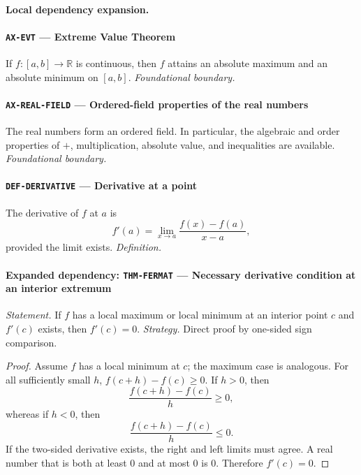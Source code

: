 \documentclass[10pt]{article}
\newcommand{\pidraw}[1]{\begingroup\urlstyle{tt}\nolinkurl{#1}\endgroup}
\theoremstyle{definition}
\theoremstyle{remark}
\begin{document}
\paragraph{Local dependency expansion.}

\paragraph{\pidraw{AX-EVT} --- Extreme Value Theorem}
If $f:[a,b]\to\mathbb{R}$ is continuous, then $f$ attains an absolute maximum and an absolute minimum on $[a,b]$.
\textit{Foundational boundary.}

\paragraph{\pidraw{AX-REAL-FIELD} --- Ordered-field properties of the real numbers}
The real numbers form an ordered field. In particular, the algebraic and order properties of $+$, multiplication, absolute value, and inequalities are available.
\textit{Foundational boundary.}

\paragraph{\pidraw{DEF-DERIVATIVE} --- Derivative at a point}
The derivative of $f$ at $a$ is
\[
f'(a)=\lim_{x\to a}\frac{f(x)-f(a)}{x-a},
\]
provided the limit exists.
\textit{Definition.}

\paragraph{Expanded dependency: \pidraw{THM-FERMAT} --- Necessary derivative condition at an interior extremum}
\textit{Statement.} If $f$ has a local maximum or local minimum at an interior point $c$ and $f'(c)$ exists, then $f'(c)=0$.
\textit{Strategy.} Direct proof by one-sided sign comparison.
\begin{proof}Assume $f$ has a local minimum at $c$; the maximum case is analogous.
For all sufficiently small $h$,
$f(c+h)-f(c)\ge0$. If $h>0$, then
\[
\frac{f(c+h)-f(c)}{h}\ge0,
\]
whereas if $h<0$, then
\[
\frac{f(c+h)-f(c)}{h}\le0.
\]
If the two-sided derivative exists, the right and left limits must agree.
A real number that is both at least $0$ and at most $0$ is $0$.
Therefore $f'(c)=0$.\end{proof}
\end{document}
